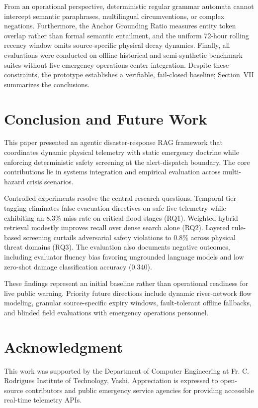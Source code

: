 \documentclass[conference]{IEEEtran}
\begin{document}
From an operational perspective, deterministic regular grammar automata cannot intercept semantic paraphrases, multilingual circumventions, or complex negations. Furthermore, the Anchor Grounding Ratio measures entity token overlap rather than formal semantic entailment, and the uniform 72-hour rolling recency window omits source-specific physical decay dynamics. Finally, all evaluations were conducted on offline historical and semi-synthetic benchmark suites without live emergency operations center integration. Despite these constraints, the prototype establishes a verifiable, fail-closed baseline; Section~VII summarizes the conclusions.

\section{Conclusion and Future Work}
This paper presented an agentic disaster-response RAG framework that coordinates dynamic physical telemetry with static emergency doctrine while enforcing deterministic safety screening at the alert-dispatch boundary. The core contributions lie in systems integration and empirical evaluation across multi-hazard crisis scenarios.

Controlled experiments resolve the central research questions. Temporal tier tagging eliminates false evacuation directives on safe live telemetry while exhibiting an 8.3\% miss rate on critical flood stages (RQ1). Weighted hybrid retrieval modestly improves recall over dense search alone (RQ2). Layered rule-based screening curtails adversarial safety violations to 0.8\% across physical threat domains (RQ3). The evaluation also documents negative outcomes, including evaluator fluency bias favoring ungrounded language models and low zero-shot damage classification accuracy (0.340).

These findings represent an initial baseline rather than operational readiness for live public warning. Priority future directions include dynamic river-network flow modeling, granular source-specific expiry windows, fault-tolerant offline fallbacks, and blinded field evaluations with emergency operations personnel.

\section*{Acknowledgment}
This work was supported by the Department of Computer Engineering at Fr. C. Rodrigues Institute of Technology, Vashi. Appreciation is expressed to open-source contributors and public emergency service agencies for providing accessible real-time telemetry APIs.
\end{document}
